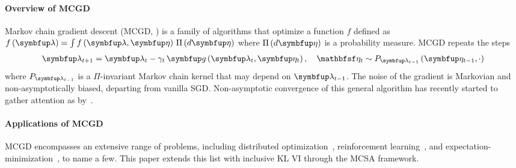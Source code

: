 \paragraph{\textbf{Overview of MCGD}}
Markov chain gradient descent (MCGD, \citealt{duchi_ergodic_2012, NEURIPS2018_1371bcce}) is a family of algorithms that optimize a function \(f\) defined as \(f\left(\vlambda\right) = \int f\left(\vlambda, \veta\right) \, \Pi\left(d\veta\right)\) where \(\Pi\left(d\veta\right)\) is a probability measure.
MCGD repeats the steps 
{%
\begin{align}
  \vlambda_{t+1}    = \vlambda_{t} - \gamma_t \, \vg\left(\vlambda_t, \veta_{t}\right),\quad 
  \rvveta_{t}  \sim P_{\vlambda_{t-1}}\left( \veta_{t-1}, \cdot \right)\label{eq:mcgd}
\end{align}
}%
where \(P_{\vlambda_{t-1}}\) is a \(\Pi\)-invariant Markov chain kernel that may depend on \(\vlambda_{t-1}\).
The noise of the gradient is Markovian and non-asymptotically biased, departing from vanilla SGD.
Non-asymptotic convergence of this general algorithm has recently started to gather attention as by~\citet{duchi_ergodic_2012, NEURIPS2018_1371bcce, pmlr-v99-karimi19a, doan_finitetime_2020, doan_convergence_2020, debavelaere_convergence_2021}.

\vspace{-0.1in}
\paragraph{\textbf{Applications of MCGD}}
MCGD encompasses an extensive range of problems, including distributed optimization~\citep{ram_incremental_2009}, reinforcement learning~\citep{tadic_asymptotic_2017, doan_convergence_2020, Xiong_Xu_Liang_Zhang_2021}, and expectation-minimization~\citep{pmlr-v99-karimi19a}, to name a few.
This paper extends this list with inclusive KL VI through the MCSA framework.

